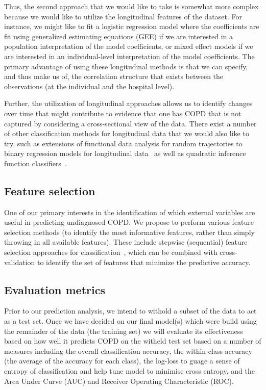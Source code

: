 \documentclass{article}
\begin{document}
Thus, the second approach that we would like to take is somewhat more complex because we would like to utilize the longitudinal features of the dataset. For instance, we might like to fit a logistic regression model where the coefficients are fit using generalized estimating equations (GEE) if we are interested in a population interpretation of the model coefficients, or mixed effect models if we are interested in an individual-level interpretation of the model coefficients. The primary advantage of using these longitudinal methods is that we can specify, and thus make us of, the correlation structure that exists between the observations (at the individual and the hospital level).

Further, the utilization of longitudinal approaches allows us to identify changes over time that might contribute to evidence that one has COPD that is not captured by considering a cross-sectional view of the data. There exist a number of other classification methods for longitudinal data that we would also like to try, such as extensions of functional data analysis for random trajectories to binary regression models for longitudinal data~\cite{muller_functional_2005} as well as quadratic inference function classifiers~\cite{wang_efficient_2014}.


\subsection{Feature selection}

One of our primary interests in the identification of which external variables are useful in predicting undiagnosed COPD. We propose to perform various feature selection methods (to identify the most informative features, rather than simply throwing in all available features). These include stepwise (sequential) feature selection approaches for classification~\cite{zhou_streamwise_2006}, which can be combined with cross-validation to identify the set of features that minimize the predictive accuracy.



\subsection{Evaluation metrics}
Prior to our prediction analysis, we intend to withold a subset of the data to act as a test set. Once we have decided on our final model(s) which were build using the remainder of the data (the training set) we will evaluate its effectiveness based on how well it predicts COPD on the witheld test set based on a number of measures including the overall classification accuracy, the within-class accuracy (the average of the accuracy for each class), the log-loss to guage a sense of entropy of classification and help tune model to minimise cross entropy, and the Area Under Curve (AUC) and Receiver Operating Characteristic (ROC).
\end{document}

